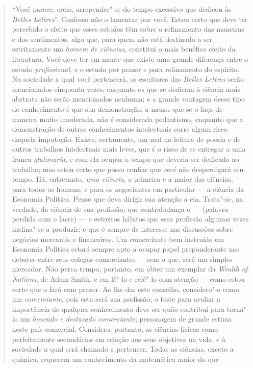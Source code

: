 \begin{quote}
``Você parece, creio, arrepender"-se do tempo excessivo que dedicou às
\emph{Belles Lettres}''. Confesso não o lamentar por você. Estou certo
que deve ter percebido o efeito que esses estudos têm sobre o
refinamento das maneiras e dos sentimentos, algo que, para quem não está
destinado a ser estritamente um \emph{homem de ciências}, constitui o
mais benéfico efeito da literatura. Você deve ter em mente que existe
uma grande diferença entre o estudo \emph{profissional,} e o estudo por
prazer e para refinamento do espírito. Na sociedade a qual você
pertencerá, os escritores das \emph{Belles Lettres} serão mencionados
cinquenta vezes, enquanto os que se dedicam à ciência mais abstrata não
serão mencionados nenhuma; e a grande vantagem desse tipo de
conhecimento é que sua demonstração, a menos que se o faça de maneira
muito imoderada, não é considerada pedantismo, enquanto que a
demonstração de outros conhecimentos intelectuais corre algum risco
daquela imputação. Existe, certamente, um mal na leitura de poesia e de
outros trabalhos intelectuais mais leves, que é o risco de se entregar a
uma franca \emph{glutonaria}, e com ela ocupar o tempo que deveria ser
dedicado ao trabalho; mas estou certo que posso confiar que \emph{você}
não desperdiçará seu tempo. Há, entretanto, \emph{uma ciência}, a
primeira e a maior das ciências, para todos os homens, e para os
negociantes em particular --- a ciência da Economia Política. Penso que
deva dirigir sua atenção a ela. Trata"-se, na verdade, da ciência de sua
profissão, que contrabalança o --- (palavra perdida com o lacre) --- e
estreitos hábitos que essa profissão algumas vezes inclina"-se a
produzir; e que é sempre de interesse nas discussões sobre negócios
mercantis e financeiros. Um comerciante bem instruído em Economia
Política estará sempre apto a ocupar papel preponderante nos debates
entre seus colegas comerciantes --- sem o que, será um simples mercador.
Não perca tempo, portanto, em obter um exemplar da \emph{Wealth of
Nations}, de Adam Smith, e em lê"-lo e relê"-lo com atenção --- como estou
certo que o fará com prazer. Ao lhe dar este conselho, considero"-o como
um \emph{comerciante}, pois esta será sua profissão; o teste para
avaliar a importância de qualquer conhecimento deve ser quão contribui
para torná"-lo um \emph{honrado e destacado comerciante}; personagem de
grande estima neste país comercial. Considero, portanto, as ciências
físicas como perfeitamente secundárias em relação aos seus objetivos na
vida, e à sociedade a qual será chamado a pertencer. Todas as ciências,
exceto a química, requerem um conhecimento da matemática maior do que

\end{quote}
